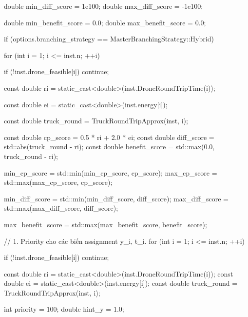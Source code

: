 {{{{                double min_diff_score = 1e100;
                double max_diff_score = -1e100;

                double min_benefit_score = 0.0;
                double max_benefit_score = 0.0;

                if (options.branching_strategy == MasterBranchingStrategy::Hybrid)
                {
                    for (int i = 1; i <= inst.n; ++i)
                    {
                        if (!inst.drone_feasible[i])
                            continue;

                        const double ri =
                            static_cast<double>(inst.DroneRoundTripTime(i));

                        const double ei =
                            static_cast<double>(inst.energy[i]);

                        const double truck_round =
                            TruckRoundTripApprox(inst, i);

                        const double cp_score = 0.5 * ri + 2.0 * ei;
                        const double diff_score = std::abs(truck_round - ri);
                        const double benefit_score = std::max(0.0, truck_round - ri);

                        min_cp_score = std::min(min_cp_score, cp_score);
                        max_cp_score = std::max(max_cp_score, cp_score);

                        min_diff_score = std::min(min_diff_score, diff_score);
                        max_diff_score = std::max(max_diff_score, diff_score);

                        max_benefit_score = std::max(max_benefit_score, benefit_score);
                    }
                }

                // 1. Priority cho các biến assignment y_i, t_i.
                for (int i = 1; i <= inst.n; ++i)
                {
                    if (!inst.drone_feasible[i])
                        continue;

                    const double ri =
                        static_cast<double>(inst.DroneRoundTripTime(i));
                    const double ei =
                        static_cast<double>(inst.energy[i]);
                    const double truck_round =
                        TruckRoundTripApprox(inst, i);

                    int priority = 100;
                    double hint_y = 1.0;

}}}}}
